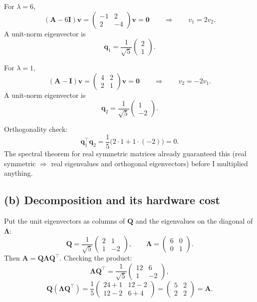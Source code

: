 \documentclass[11pt]{article}
\newcommand{\vct}[1]{\mathbf{#1}}
\newcommand{\mat}[1]{\mathbf{#1}}
\begin{document}
For \(\lambda=6\),
\[
(\mat{A}-6\mat{I})\vct{v}
=
\begin{pmatrix}
-1 & 2 \\
2 & -4
\end{pmatrix}
\vct{v}
= \vct{0}
\qquad\Rightarrow\qquad
v_1 = 2v_2.
\]
A unit-norm eigenvector is
\[
\vct{q}_1
= \frac{1}{\sqrt{5}}
\begin{pmatrix} 2 \\ 1 \end{pmatrix}.
\]

For \(\lambda=1\),
\[
(\mat{A}-\mat{I})\vct{v}
=
\begin{pmatrix}
4 & 2 \\
2 & 1
\end{pmatrix}
\vct{v}
= \vct{0}
\qquad\Rightarrow\qquad
v_2 = -2v_1.
\]
A unit-norm eigenvector is
\[
\vct{q}_2
= \frac{1}{\sqrt{5}}
\begin{pmatrix} 1 \\ -2 \end{pmatrix}.
\]

Orthogonality check:
\[
\vct{q}_1^\top \vct{q}_2
= \frac{1}{5}\bigl(2\cdot 1 + 1\cdot(-2)\bigr)
= 0.
\]
The spectral theorem for real symmetric matrices already guaranteed this
(real symmetric \(\Rightarrow\) real eigenvalues and orthogonal eigenvectors)
before I multiplied anything.

\subsection*{(b) Decomposition and its hardware cost}

Put the unit eigenvectors as columns of \(\mat{Q}\) and the eigenvalues on
the diagonal of \(\mat{\Lambda}\):
\[
\mat{Q}
=
\frac{1}{\sqrt{5}}
\begin{pmatrix}
2 & 1 \\
1 & -2
\end{pmatrix},
\qquad
\mat{\Lambda}
=
\begin{pmatrix}
6 & 0 \\
0 & 1
\end{pmatrix}.
\]
Then \(\mat{A} = \mat{Q}\mat{\Lambda}\mat{Q}^\top\). Checking the product:
\[
\mat{\Lambda}\mat{Q}^\top
=
\frac{1}{\sqrt{5}}
\begin{pmatrix}
12 & 6 \\
1 & -2
\end{pmatrix},
\]
\[
\mat{Q}(\mat{\Lambda}\mat{Q}^\top)
=
\frac{1}{5}
\begin{pmatrix}
24+1 & 12-2 \\
12-2 & 6+4
\end{pmatrix}
=
\begin{pmatrix}
5 & 2 \\
2 & 2
\end{pmatrix}
= \mat{A}.
\]
\end{document}
